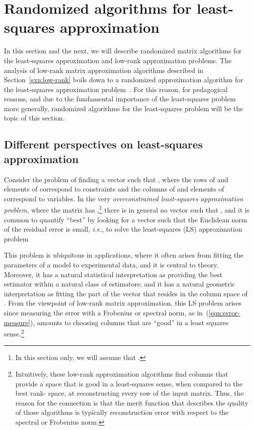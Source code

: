 \documentclass[twoside]{article}
\begin{document}
 \section{Randomized algorithms for least-squares approximation}
\label{sxn:least-squares}

In this section and the next, we will describe randomized matrix algorithms
for the least-squares approximation and low-rank approximation problems.
The analysis of low-rank matrix approximation algorithms described in 
Section~\ref{sxn:low-rank} boils down to a randomized approximation 
algorithm for the least-squares approximation 
problem~\cite{DMM08_CURtheory_JRNL,CUR_PNAS,BMD09_CSSP_SODA,BMD08_CSSP_TRv2}.
For this reason, for pedagogical reasons, and due to the fundamental 
importance of the least-squares problem more generally, randomized algorithms for the least-squares 
problem will be the topic of this section.



\subsection{Different perspectives on least-squares approximation}
\label{sxn:least-squares:perspectives}

Consider the problem of finding a vector  such that , 
where the rows of  and elements of  correspond to constraints and the 
columns of  and elements of  correspond to variables.
In the very \emph{overconstrained least-squares approximation problem}, 
where the  matrix  has ,\footnote{In this section only, we will assume that .}
there is in general no vector  such that , and it is 
common to quantify ``best'' by looking for a vector  such that the 
Euclidean norm of the residual error is small, \emph{i.e.}, to solve 
the least-squares (LS) approximation problem

This problem is ubiquitous in applications, where it often arises from 
fitting the parameters of a model to experimental data, and it is central 
to theory.
Moreover, it has a natural statistical interpretation as providing the best 
estimator within a natural class of estimators; and it has a natural 
geometric interpretation as fitting the part of the vector  that resides 
in the column space of .
From the viewpoint of low-rank matrix approximation, this LS problem arises 
since measuring the error with a Frobenius or spectral norm, as 
in~(\ref{eqn:error-measure}), amounts to choosing columns that are ``good'' 
in a least squares sense.\footnote{Intuitively, these low-rank approximation algorithms find columns 
that provide a space that is good in a least-squares sense, when compared 
to the best rank- space, at reconstructing every row of the input 
matrix.  Thus, the reason for the connection is that the merit function 
that describes the quality of those algorithms is typically reconstruction 
error with respect to the spectral or Frobenius norm.} 
\end{document}

